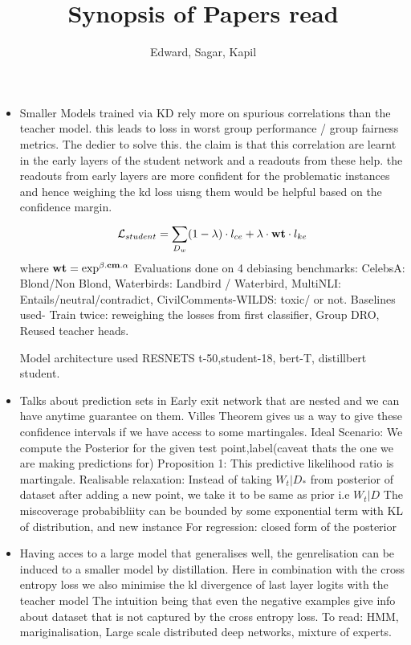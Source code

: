 \documentclass{article}
\begin{document}
\title{Synopsis of Papers read}
\author{Edward, Sagar, Kapil}
\maketitle

\begin{itemize}
    \item
          \cite{tiwari_using_2024}
          Smaller Models trained via KD rely more on spurious correlations than the teacher model. this leads to loss in
          worst group performance / group fairness metrics. The dedier to solve this. the claim is that this correlation
          are learnt in the early layers of the student network and a readouts from these help. the readouts from early layers
          are more confident for the problematic instances and hence weighing the kd loss uisng them would be helpful based on the confidence
          margin.
          \[ \mathcal{L}_{student} =
          \sum_{D_w}^{} (1- \lambda) \cdot l_{ce}  \\
          + \lambda \cdot \textbf{wt} \cdot l_{ke} \] 
          where \(\bf{wt} = \exp^{\beta.\bf{cm}.\alpha} \)  
          Evaluations done on 4 debiasing benchmarks: CelebsA: Blond/Non Blond, Waterbirds: Landbird / Waterbird, MultiNLI: Entails/neutral/contradict,
          CivilComments-WILDS: toxic/ or not. Baselines used- Train twice: reweighing the losses from first classifier, Group DRO, Reused teacher heads.

          Model architecture used RESNETS t-50,student-18, bert-T, distillbert student. 
    \item
          \cite{jazbec_early-exit_2024} Talks about prediction sets in Early exit network that are nested and we can have anytime guarantee on them.
          Villes Theorem gives us a way to give these confidence intervals if we have access to some martingales. 
          Ideal Scenario: We compute the Posterior for the given test point,label(caveat thats the one we are making predictions for)
          Proposition 1: This predictive likelihood ratio is martingale. Realisable relaxation: Instead of taking \(W_t|D_* \)  from posterior of dataset 
          after adding a new point, we take it to be same as prior i.e \(W_t|D \)  The miscoverage probabibliity can be bounded by some exponential term with KL of distribution, and new instance
          For regression: closed form of the posterior
    \item
          \cite{hinton_distilling_2015} Having acces to a large model that generalises well, the genrelisation can be
          induced to a smaller model by distillation. Here in combination with the cross entropy loss we also minimise the
          kl divergence of last layer logits with the teacher model
          The intuition being that even the negative examples give info about dataset that is not captured by the cross entropy loss.
          To read: HMM, mariginalisation, Large scale distributed deep networks, mixture of experts.
\end{itemize}
\end{document}
